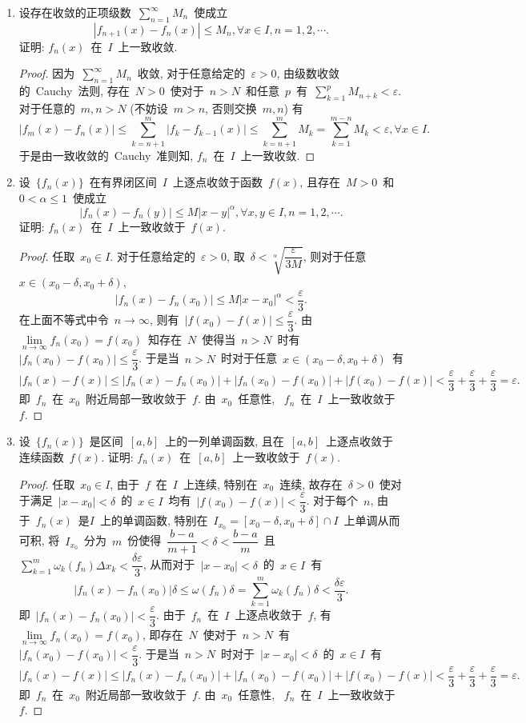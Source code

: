 \documentclass[UTF8,a4paper,20pt]{article}
\begin{document}
\begin{enumerate}[1.]
\item 设存在收敛的正项级数~$\sum\limits_{n=1}^{\infty}M_n$~使成立
\[ |f_{n+1}(x)-f_n(x)|\leqslant M_n, \forall x\in I, n=1,2,\cdots.\]
证明: $f_n(x)$~在~$I$~上一致收敛.
\begin{proof}
	因为~$\sum\limits_{n=1}^{\infty}M_n$~收敛, 对于任意给定的~$\varepsilon>0$, 由级数收敛的~Cauchy~法则, 存在~$N>0$~使对于~$n>N$~和任意~$p$~有~$\sum_{k=1}^p M_{n+k}<\varepsilon$. 对于任意的~$m,n>N$ (不妨设~$m>n$, 否则交换~$m,n$) 有
\[ |f_m(x)-f_n(x)|\leqslant \sum_{k=n+1}^m |f_k-f_{k-1}(x)|\leqslant\sum_{k=n+1}^m M_k=\sum_{k=1}^{m-n} M_k<\varepsilon, \forall x\in I.\]
于是由一致收敛的~Cauchy~准则知, $f_n$~在~$I$~上一致收敛. 
\end{proof}

\item 设~$\{f_n(x)\}$~在有界闭区间~$I$~上逐点收敛于函数~$f(x)$, 且存在~$M>0$~和~$0<\alpha\leqslant1$~使成立
\[ |f_n(x)-f_n(y)|\leqslant M|x-y|^{\alpha}, \forall x,y \in I, n=1,2,\cdots.\]
证明: $f_n(x)$~在~$I$~上一致收敛于~$f(x)$.
\begin{proof}
	任取~$x_0\in I$. 对于任意给定的~$\varepsilon>0$, 取~$\delta<\sqrt[\alpha]{\dfrac{\varepsilon}{3M}}$, 则对于任意~$x\in(x_0-\delta,x_0+\delta)$,
\[|f_n(x)-f_n(x_0)|\leqslant M|x-x_0|^{\alpha}<\dfrac{\varepsilon}{3}.\]
在上面不等式中令~$n\to\infty$, 则有~$|f(x_0)-f(x)|\leqslant \dfrac{\varepsilon}{3}$. 由~$\lim\limits_{n\to\infty} f_n(x_0)=f(x_0)$~知存在~$N$~使得当~$n>N$~时有~$|f_n(x_0)-f(x_0)|\leqslant \dfrac{\varepsilon}{3}$. 于是当~$n>N$~时对于任意~$x\in(x_0-\delta,x_0+\delta)$~有
\[|f_n(x)-f(x)|\leqslant|f_n(x)-f_n(x_0)|+|f_n(x_0)-f(x_0)|+|f(x_0)-f(x)|<\dfrac{\varepsilon}{3}+\dfrac{\varepsilon}{3}+\dfrac{\varepsilon}{3}=\varepsilon.\]
即~$f_n$~在~$x_0$~附近局部一致收敛于~$f$. 由~$x_0$~任意性, ~$f_n$~在~$I$~上一致收敛于~$f$.
\end{proof}

\item 设~$\{f_n(x)\}$~是区间~$[a,b]$~上的一列单调函数, 且在~$[a,b]$~上逐点收敛于连续函数~$f(x)$. 证明: $f_n(x)$~在~$[a,b]$~上一致收敛于~$f(x)$.
\begin{proof}
任取~$x_0\in I$, 由于~$f$~在~$I$~上连续, 特别在~$x_0$~连续, 故存在~$\delta>0$~使对于满足~$|x-x_0|<\delta$~的~$x\in I$~均有~$|f(x_0)-f(x)|<\dfrac{\varepsilon}{3}$. 对于每个~$n$, 由于~$f_n(x)$~是$I$~上的单调函数, 特别在~$I_{x_0}=[x_0-\delta,x_0+\delta]\cap I$~上单调从而可积, 将~$I_{x_0}$~分为~$m$~份使得~$\dfrac{b-a}{m+1}<\delta<\dfrac{b-a}{m}$~且~$\sum\limits_{k=1}^m \omega_{k}(f_n)\Delta x_k<\dfrac{\delta\varepsilon}{3}$, 从而对于~$|x-x_0|<\delta$~的~$x\in I$~有
\[|f_n(x)-f_n(x_0)|\delta\leqslant\omega(f_n)\delta=\sum_{k=1}^m\omega_k(f_n)\delta<\dfrac{\delta\varepsilon}{3}.\]
即~$|f_n(x)-f_n(x_0)|<\dfrac{\varepsilon}{3}$. 由于~$f_n$~在~$I$~上逐点收敛于~$f$, 有~$\lim\limits_{n\to\infty} f_n(x_0)=f(x_0)$, 即存在~$N$~使对于~$n>N$~有~$|f_n(x_0)-f(x_0)|<\dfrac{\varepsilon}{3}$. 于是当~$n>N$~时对于~$|x-x_0|<\delta$~的~$x\in I$~有
\[|f_n(x)-f(x)|\leqslant|f_n(x)-f_n(x_0)|+|f_n(x_0)-f(x_0)|+|f(x_0)-f(x)|<\dfrac{\varepsilon}{3}+\dfrac{\varepsilon}{3}+\dfrac{\varepsilon}{3}=\varepsilon.\]
即~$f_n$~在~$x_0$~附近局部一致收敛于~$f$. 由~$x_0$~任意性, ~$f_n$~在~$I$~上一致收敛于~$f$.
\end{proof}


\end{enumerate}
\end{document}
